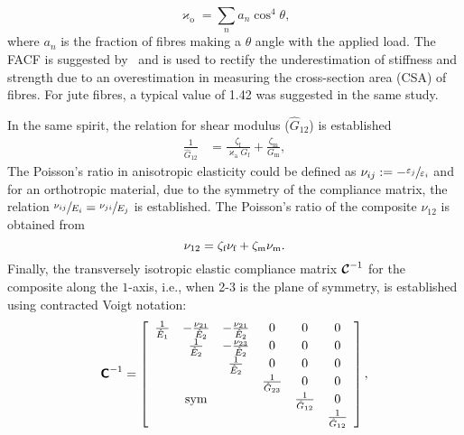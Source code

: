 		\begin{equation}
			\varkappa_\text{o}=\sum_n a_n\cos^4\theta,\label{eq:Krenchel}
		\end{equation}
	where $a_n$ is the fraction of fibres making a $\theta$ angle with the applied load. The FACF is suggested by~\autocite{Virk.2009} and is used to rectify the underestimation of stiffness and strength due to an overestimation in measuring the cross-section area (CSA) of fibres. For jute fibres, a typical value of 1.42 was suggested in the same study. 
	
	In the same spirit, the relation for shear modulus ($\hat{G}_{12}$) is established
	\begin{subequations}
	\begin{alignat}{2}
		\frac{1}{\hat{G}_{12} } &=\frac{\zeta_\text{f}}{\varkappa_\text{a} G_\text{f}}+ \frac{\zeta_\text{m}}{G_\text{m}},\label{eq:enirom2}
	\end{alignat}
	\end{subequations}
	The Poisson's ratio in anisotropic elasticity could be defined as $\nu_{ij}\mathrel{:=} -\sfrac{\varepsilon_j}{\varepsilon_i}$ and for an orthotropic material, due to the symmetry of the compliance matrix, the relation $ \sfrac{\nu_{ij}}{E_i}  =\sfrac{\nu_{ji}}{E_j}$ is established. The Poisson's ratio of the composite $\nu_{12}$ is obtained from
	\begin{equation}
		\nu_{12}= \zeta_\text{f}\nu_\text{f}+\zeta_\text{m}\nu_\text{m}.\label{eq:enrom2}\\
	\end{equation}
	Finally, the transversely isotropic elastic compliance matrix $\mathord{\mbox{\boldmath$\mathcal{C}$}}^{-1}$ for the composite along the $1$-axis, i.e., when 2-3 is the plane of symmetry, is established using contracted Voigt notation:
	\begin{equation}\label{eq:Cinv}
	\mat{C}^\inv=
	\left[
	\begin{array}{cccccc}
		\frac{1}{\hat{E}_1} & -\frac{\nu_{21}}{\hat{E}_2} & -\frac{\nu_{21}}{\hat{E}_2} &            0            &            0            &            0            \\
		                      &       \frac{1}{\hat{E}_2}        & -\frac{\nu_{23}}{\hat{E}_2} &            0            &            0            &            0            \\
		                      &                                   &       \frac{1}{\hat{E}_2}        &            0            &            0            &            0            \\
		                      &                                   &                                   & \frac{1}{\hat{G}_{23}} &            0            &            0            \\
		                      &            \text{sym}             &                                   &                         & \frac{1}{\hat{G}_{12}} &            0            \\
		                      &                                   &                                   &                         &                         & \frac{1}{\hat{G}_{12}}
	\end{array}
	\right],
	\end{equation}		
